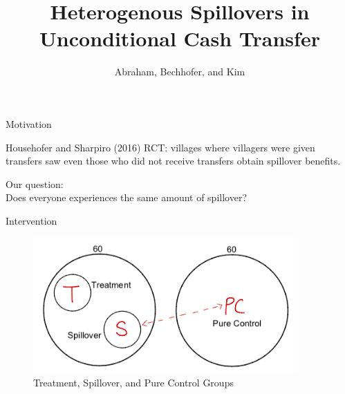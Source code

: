 \documentclass[14pt, aspectratio=169]{beamer}
\title[Heteregenous Spillovers in Unconditional Cash Transfer] %
{Heterogenous Spillovers in Unconditional Cash Transfer}
\author[Abraham, Bechhofer, and Kim] %
{Abraham, Bechhofer, and Kim }
\newenvironment{wideitemize}{\itemize\addtolength{\itemsep}{10pt}}{\enditemize}
\let\OLDitemize\itemize
\renewcommand\itemize{\OLDitemize\addtolength{\itemsep}{10pt}}
\begin{document}
\begin{frame}
  \titlepage
\end{frame}

\begin{frame}{Motivation}
\begin{wideitemize}
	\item Househofer and Sharpiro (2016) RCT: villages where villagers were given transfers saw even those who did not receive transfers obtain spillover benefits.
	\item Our question: \\ Does everyone experiences the same amount of spillover? 
\end{wideitemize}
\end{frame}


\begin{frame}{Intervention}
\begin{figure}[H]
	\centering
	\includegraphics[width=0.9\textwidth]{design.png}
	\caption{Treatment, Spillover, and Pure Control Groups}
\end{figure}
\end{frame}
\end{document}

